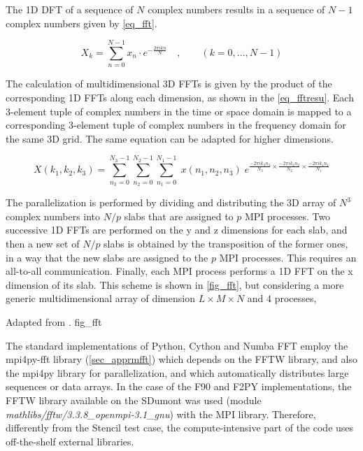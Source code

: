 The 1D DFT of a sequence of $N$ complex numbers results in a sequence of $N-1$ complex numbers given by \autoref {eq_fft}.

\begin{equation}\label{eq_fft}
X_k = \sum_{n=0}^{N-1} x_n \cdot
	  e^{\textstyle - {\frac{\textstyle 2 \pi i k n}{N} } }
	  \quad , \qquad ( k = 0, ..., N-1 )
\end{equation}

The calculation of multidimensional 3D FFTs is given by the product of the corresponding 1D FFTs along each dimension, as shown in the \autoref {eq_fftresu}. Each 3-element tuple of complex numbers in the time or space domain is mapped to a corresponding 3-element tuple of complex numbers in the frequency domain for the same 3D grid. The same equation can be adapted for higher dimensions.

\begin{equation}\label{eq_fftresu}
X ( k_1, k_2, k_3 ) = 
    \sum_{ n_3 = 0 } ^ { N_3 - 1 }
    \sum_{ n_2 = 0 } ^ { N_2 - 1 } 
    \sum_{ n_1 = 0 } ^ { N_1 - 1 }
    \; x ( n_1, n_2, n_3 ) \;
    e^{
        \frac{ - 2 \pi i k_3 n_3 } { N_3 } \times
        \frac{ - 2 \pi i k_2 n_2 } { N_2 } \times
        \frac{ - 2 \pi i k_1 n_1 } { N_1 }
    }
\end{equation}

The parallelization is performed by dividing and distributing the 3D array of $N^3$ complex numbers into $N/p$ slabs that are assigned to $p$ MPI processes. Two successive 1D FFTs are performed on the y and z dimensions for each slab, and then a new set of $N/p$ slabs is obtained by the transposition of the former ones, in a way that the new slabs are assigned to the $p$ MPI processes. This requires an all-to-all communication. Finally, each MPI process performs a 1D FFT on the x dimension of its slab. This scheme is shown in \autoref {fig_fft}, but considering a more generic multidimensional array of dimension $L\times M \times N$ and $4$ processes,  

     {Adapted from .} {fig_fft}

The standard implementations of Python, Cython and Numba FFT employ the mpi4py-fft library (\autoref {sec_apprmfft}) which depends on the FFTW library, and also the mpi4py library for parallelization, and which automatically distributes large sequences or data arrays. In the case of the F90 and F2PY implementations, the FFTW library available on the SDumont was used (module \textit {mathlibs/fftw/3.3.8\_openmpi-3.1\_gnu}) with the MPI library. Therefore, differently from the Stencil test case, the compute-intensive part of the code uses off-the-shelf external libraries.

